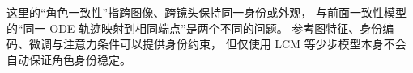 这里的“角色一致性”指跨图像、跨镜头保持同一身份或外观，
与前面一致性模型的“同一 ODE 轨迹映射到相同端点”是两个不同的问题。
参考图特征、身份编码、微调与注意力条件可以提供身份约束，
但仅使用 LCM 等少步模型本身不会自动保证角色身份稳定。
